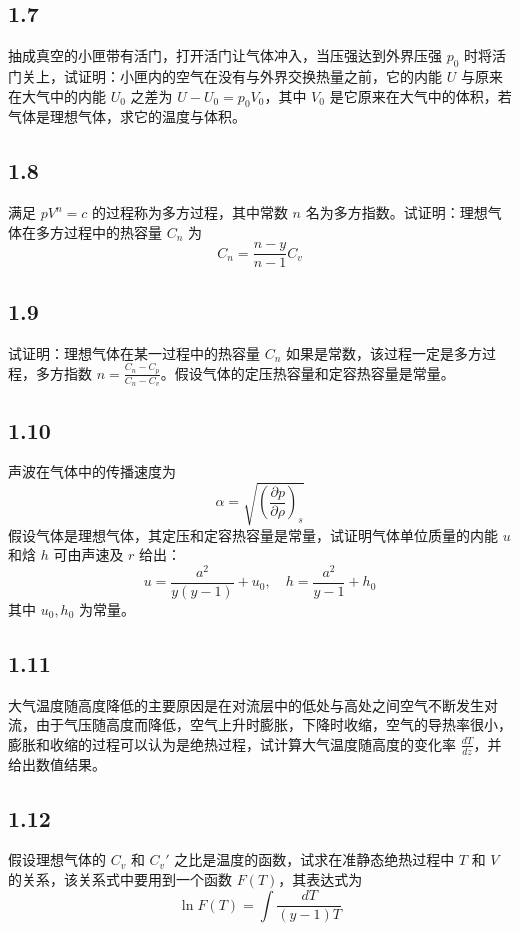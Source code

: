 \newpage
\subsection{1.7}
抽成真空的小匣带有活门，打开活门让气体冲入，当压强达到外界压强 $p_0$ 时将活门关上，试证明：小匣内的空气在没有与外界交换热量之前，它的内能 $U$ 与原来在大气中的内能 $U_0$ 之差为 $U - U_0 = p_0 V_0$，其中 $V_0$ 是它原来在大气中的体积，若气体是理想气体，求它的温度与体积。

\newpage
\subsection{1.8}
满足 $pV^n = c$ 的过程称为多方过程，其中常数 $n$ 名为多方指数。试证明：理想气体在多方过程中的热容量 $C_n$ 为
$$
C_n = \frac{n - y}{n - 1} C_v
$$

\newpage
\subsection{1.9}
试证明：理想气体在某一过程中的热容量 $C_n$ 如果是常数，该过程一定是多方过程，多方指数 $n = \frac{C_n - C_p}{C_n - C_v}$。假设气体的定压热容量和定容热容量是常量。

\newpage
\subsection{1.10}
声波在气体中的传播速度为
$$
\alpha = \sqrt{\left(\frac{\partial p}{\partial \rho}\right)_s}
$$
假设气体是理想气体，其定压和定容热容量是常量，试证明气体单位质量的内能 $u$ 和焓 $h$ 可由声速及 $r$ 给出：
$$
u = \frac{a^2}{y(y-1)} + u_0, \quad h = \frac{a^2}{y-1} + h_0
$$
其中 $u_0, h_0$ 为常量。

\newpage
\subsection{1.11}
大气温度随高度降低的主要原因是在对流层中的低处与高处之间空气不断发生对流，由于气压随高度而降低，空气上升时膨胀，下降时收缩，空气的导热率很小，膨胀和收缩的过程可以认为是绝热过程，试计算大气温度随高度的变化率 $\frac{dT}{dz}$，并给出数值结果。

\newpage
\subsection{1.12}
假设理想气体的 $C_v$ 和 $C_v'$ 之比是温度的函数，试求在准静态绝热过程中 $T$ 和 $V$ 的关系，该关系式中要用到一个函数 $F(T)$，其表达式为
$$
\ln F(T) = \int \frac{dT}{(y-1)T}
$$

